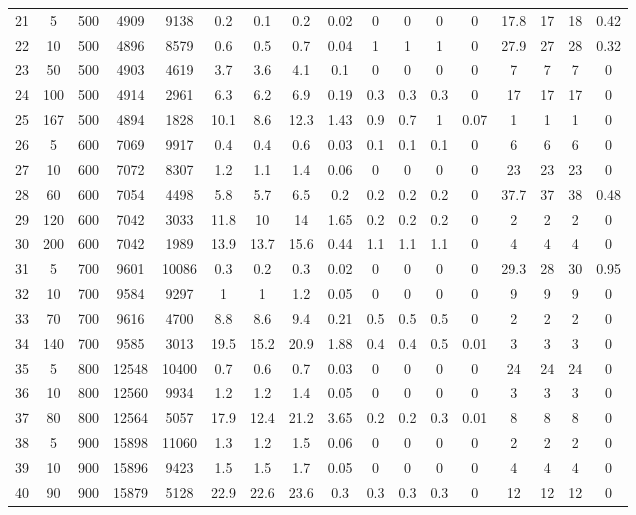 \documentclass[11pt]{article}
\newcommand{\np}{\newpage}
\begin{document}
\begin{appendices}
\begin{landscape}
\begin{longtable}[c]{ccccc|cccc|cccc|cccc}
				\np
				\rowcolor[HTML]{EFEFEF} 
				21 & 5 & 500 & 4909 & 9138 & 0.2 & 0.1 & 0.2 & 0.02 & 0 & 0 & 0 & 0 & 17.8 & 17 & 18 & 0.42 \\
				\rowcolor[HTML]{EFEFEF} 
				22 & 10 & 500 & 4896 & 8579 & 0.6 & 0.5 & 0.7 & 0.04 & 1 & 1 & 1 & 0 & 27.9 & 27 & 28 & 0.32 \\
				\rowcolor[HTML]{EFEFEF} 
				23 & 50 & 500 & 4903 & 4619 & 3.7 & 3.6 & 4.1 & 0.1 & 0 & 0 & 0 & 0 & 7 & 7 & 7 & 0 \\
				\rowcolor[HTML]{EFEFEF} 
				24 & 100 & 500 & 4914 & 2961 & 6.3 & 6.2 & 6.9 & 0.19 & 0.3 & 0.3 & 0.3 & 0 & 17 & 17 & 17 & 0 \\
				\rowcolor[HTML]{EFEFEF} 
				25 & 167 & 500 & 4894 & 1828 & 10.1 & 8.6 & 12.3 & 1.43 & 0.9 & 0.7 & 1 & 0.07 & 1 & 1 & 1 & 0 \\
				26 & 5 & 600 & 7069 & 9917 & 0.4 & 0.4 & 0.6 & 0.03 & 0.1 & 0.1 & 0.1 & 0 & 6 & 6 & 6 & 0 \\
				27 & 10 & 600 & 7072 & 8307 & 1.2 & 1.1 & 1.4 & 0.06 & 0 & 0 & 0 & 0 & 23 & 23 & 23 & 0 \\
				28 & 60 & 600 & 7054 & 4498 & 5.8 & 5.7 & 6.5 & 0.2 & 0.2 & 0.2 & 0.2 & 0 & 37.7 & 37 & 38 & 0.48 \\
				29 & 120 & 600 & 7042 & 3033 & 11.8 & 10 & 14 & 1.65 & 0.2 & 0.2 & 0.2 & 0 & 2 & 2 & 2 & 0 \\
				30 & 200 & 600 & 7042 & 1989 & 13.9 & 13.7 & 15.6 & 0.44 & 1.1 & 1.1 & 1.1 & 0 & 4 & 4 & 4 & 0 \\
				\rowcolor[HTML]{EFEFEF} 
				31 & 5 & 700 & 9601 & 10086 & 0.3 & 0.2 & 0.3 & 0.02 & 0 & 0 & 0 & 0 & 29.3 & 28 & 30 & 0.95 \\
				\rowcolor[HTML]{EFEFEF} 
				32 & 10 & 700 & 9584 & 9297 & 1 & 1 & 1.2 & 0.05 & 0 & 0 & 0 & 0 & 9 & 9 & 9 & 0 \\
				\rowcolor[HTML]{EFEFEF} 
				33 & 70 & 700 & 9616 & 4700 & 8.8 & 8.6 & 9.4 & 0.21 & 0.5 & 0.5 & 0.5 & 0 & 2 & 2 & 2 & 0 \\
				\rowcolor[HTML]{EFEFEF} 
				34 & 140 & 700 & 9585 & 3013 & 19.5 & 15.2 & 20.9 & 1.88 & 0.4 & 0.4 & 0.5 & 0.01 & 3 & 3 & 3 & 0 \\
				35 & 5 & 800 & 12548 & 10400 & 0.7 & 0.6 & 0.7 & 0.03 & 0 & 0 & 0 & 0 & 24 & 24 & 24 & 0 \\
				36 & 10 & 800 & 12560 & 9934 & 1.2 & 1.2 & 1.4 & 0.05 & 0 & 0 & 0 & 0 & 3 & 3 & 3 & 0 \\
				37 & 80 & 800 & 12564 & 5057 & 17.9 & 12.4 & 21.2 & 3.65 & 0.2 & 0.2 & 0.3 & 0.01 & 8 & 8 & 8 & 0 \\
				\rowcolor[HTML]{EFEFEF} 
				38 & 5 & 900 & 15898 & 11060 & 1.3 & 1.2 & 1.5 & 0.06 & 0 & 0 & 0 & 0 & 2 & 2 & 2 & 0 \\
				\rowcolor[HTML]{EFEFEF} 
				39 & 10 & 900 & 15896 & 9423 & 1.5 & 1.5 & 1.7 & 0.05 & 0 & 0 & 0 & 0 & 4 & 4 & 4 & 0 \\
				\rowcolor[HTML]{EFEFEF} 
				40 & 90 & 900 & 15879 & 5128 & 22.9 & 22.6 & 23.6 & 0.3 & 0.3 & 0.3 & 0.3 & 0 & 12 & 12 & 12 & 0
			\end{longtable}
		\end{landscape}
		

\end{appendices}
\end{document}
